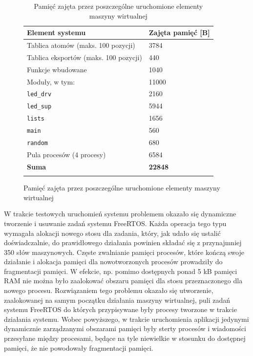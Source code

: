 \begin{figure}[h]
\begin{longtable}{|l|l|}
\hline

\textbf{Element systemu} & \textbf{Zajęta pamięć [B]} \\
\endfirsthead
\hline
Tablica atomów (maks. 100 pozycji) & 3784 \\
\hline
Tablica eksportów (maks. 100 pozycji) & 440 \\
\hline
Funkcje wbudowane & 1040 \\
\hline
Moduły, w tym: & 11000 \\
{\small \texttt{led\_drv}} & {\small 2160} \\
{\small \texttt{led\_sup}} & {\small 5944} \\
{\small \texttt{lists}} & {\small 1656} \\
{\small \texttt{main}} & {\small 560} \\
{\small \texttt{random}} & {\small 680} \\
\hline
Pula procesów (4 procesy) & 6584 \\
\hline
\textbf{Suma} & \textbf{22848} \\
\hline

\caption{Pamięć zajęta przez poszczególne uruchomione elementy maszyny wirtualnej} 
\label{table:ledMemory} \\
\end{longtable}
\end{figure}

W trakcie testowych uruchomień systemu problemem okazało się dynamiczne tworzenie i usuwanie zadań systemu FreeRTOS.
Każda operacja tego typu wymagała alokacji nowego stosu dla zadania, który, jak udało się ustalić doświadczalnie, do prawidłowego działania powinien składać się z przynajmniej 350 słów maszynowych.
Częste zwalnianie pamięci procesów, które kończą swoje działanie i alokacja pamięci dla nowotworzonych procesów prowadziły do fragmentacji pamięci. W efekcie, np. pomimo dostępnych ponad 5 kB pamięci RAM nie można było zaalokować obszaru pamięci dla stosu przeznaczonego dla nowego procesu.
Rozwiązaniem tego problemu okazało się utworzenie, zaalokowanej na samym początku działania maszyny wirtualnej, puli zadań systemu FreeRTOS do których przypisywane były procesy tworzone w trakcie działania systemu.
Wobec powyższego, w trakcie uruchomienia aplikacji jedynymi dynamicznie zarządzanymi obszarami pamięci były sterty procesów i wiadomości przesyłane między procesami, będące na tyle niewielkie w stosunku do dostępnej pamięci, że nie powodowały fragmentacji pamięci.

